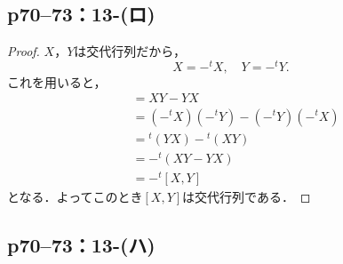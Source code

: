 \documentclass[a4paper,10pt,fleqn]{ltjsarticle}
\begin{document}
\subsection*{p70--73：13-(ロ)}

\begin{tleftbar}
    \begin{proof}
        $X$，$Y$は交代行列だから，
        \[
            X=- {}^t X ,\quad Y = -{}^t Y .
        \]
        これを用いると，
        \begin{align*}
            [X,Y] & = XY -YX                                   \\
                  & = (-{}^t X) (-{}^t Y) - (-{}^t Y)(-{}^t X) \\
                  & = {}^t (YX) - {}^t (XY)                    \\
                  & = -{}^t (XY-YX)                            \\
                  & = -{}^t [X,Y]
        \end{align*}
        となる．よってこのとき$[X,Y]$は交代行列である．
    \end{proof}
\end{tleftbar}

\newpage

\subsection*{p70--73：13-(ハ)}
\end{document}
